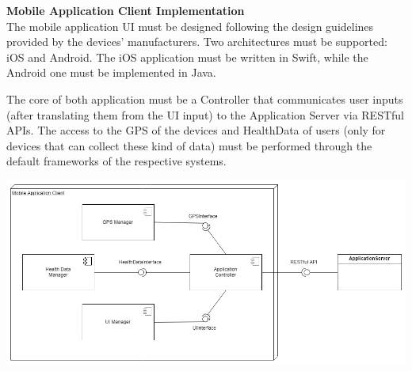 \hspace{-\parindent}\textbf{Mobile Application Client Implementation}\\

The mobile application UI must be designed following the design guidelines provided by the devices’ manufacturers. Two architectures must be supported: iOS and Android. The iOS application must be written in Swift, while the Android one must be implemented in Java.

The core of both application must be a Controller that communicates user inputs (after translating them from the UI input) to the Application Server via RESTful APIs. The access to the GPS of the devices and HealthData of users (only for devices that can collect these kind of data) must be performed through the default frameworks of the respective systems.
\begin{center}
\includegraphics[scale=0.45]{sections/diagrams/mac.png}
\newline
{}
\end{center}

\clearpage
%